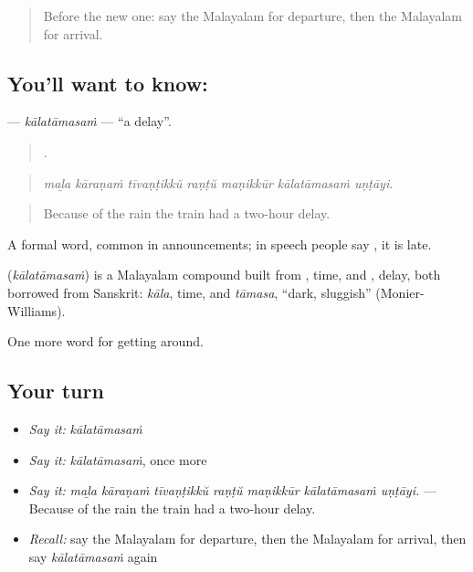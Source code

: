 \label{lesson:ML-C465-kalatamasam}



\begin{quote}
Before the new one: say the Malayalam for departure, then the Malayalam for arrival.
\end{quote}

\subsection*{You'll want to know: }
\textbf{} — \emph{kālatāmasaṁ} — \textquotedblleft{}a delay\textquotedblright{}.

\begin{quote}
      .
\end{quote}

\begin{quote}
\emph{maḻa kāraṇaṁ tīvaṇṭikkŭ raṇṭŭ maṇikkūr kālatāmasaṁ uṇṭāyi.}
\end{quote}

\begin{quote}
Because of the rain the train had a two-hour delay.
\end{quote}

A formal word, common in announcements; in speech people say , it is late.

\begin{cousinweb}
\textbf{} (\emph{kālatāmasaṁ}) is a Malayalam compound built from , time, and , delay, both borrowed from Sanskrit: \emph{kāla}, time, and \emph{tāmasa}, \textquotedblleft{}dark, sluggish\textquotedblright{} (Monier-Williams).
\end{cousinweb}

\begin{grammarlens}[title={What you've built}]
One more word for getting around.
\end{grammarlens}

\subsection*{Your turn}
\begin{itemize}
\raggedright
  \item \emph{Say it:} \emph{kālatāmasaṁ}
  \item \emph{Say it:} \emph{kālatāmasaṁ}, once more
  \item \emph{Say it:} \emph{maḻa kāraṇaṁ tīvaṇṭikkŭ raṇṭŭ maṇikkūr kālatāmasaṁ uṇṭāyi.} — Because of the rain the train had a two-hour delay.
  \item \emph{Recall:} say the Malayalam for departure, then the Malayalam for arrival, then say \emph{kālatāmasaṁ} again
\end{itemize}

